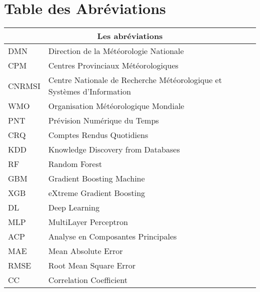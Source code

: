 \chapter*{Table des Abréviations}
\label{chap:abreviations}
\begin{table}[h!]
        \centering
        \begin{tabular}{|p{2cm}p{8cm}|}
        \hline
        \multicolumn{2}{|c|}{Les abréviations}  \\ \hline
         DMN & Direction de la Météorologie Nationale  \\
         CPM & Centres Provinciaux Météorologiques \\
         CNRMSI & Centre Nationale de Recherche Météorologique et Systèmes d'Information\\
         WMO & Organisation Météorologique Mondiale\\
         PNT & Prévision Numérique du Temps\\
         CRQ & Comptes Rendus Quotidiens\\
         KDD & Knowledge Discovery from Databases\\
         RF & Random Forest  \\ 
         GBM & Gradient Boosting Machine \\
         XGB & eXtreme Gradient Boosting \\
         DL & Deep Learning \\
         MLP & MultiLayer Perceptron \\
         ACP & Analyse en Composantes Principales \\
         MAE & Mean Absolute Error \\
         RMSE & Root Mean Square Error \\
         CC & Correlation Coefficient\\
         
         \hline
        \end{tabular}
        \end{table}
